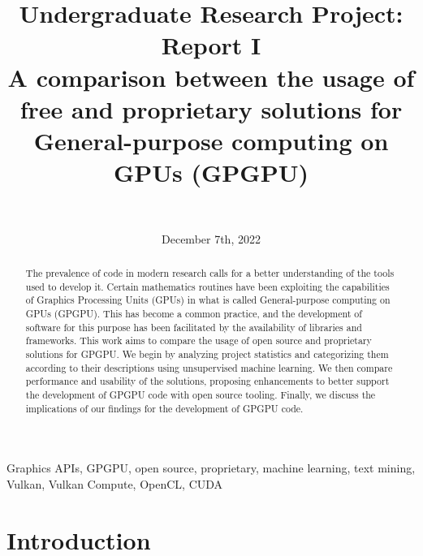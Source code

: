 \documentclass[11pt, conference, onecolumn, final]{IEEEtran}
\begin{document}
\title{\textbf{Undergraduate Research Project: Report I} \\
{A comparison between the usage of free and proprietary solutions for General-purpose computing on GPUs (GPGPU)}
}

\date{December 7th, 2022}

\author{ \\
\and
{}
}

\maketitle

\begin{abstract}
    The prevalence of code in modern research calls for a better understanding
    of the tools used to develop it.
    Certain mathematics routines have been exploiting the capabilities of
    Graphics Processing Units (GPUs) in what is called General-purpose
    computing on GPUs (GPGPU).
    This has become a common practice, and the development of software for this
    purpose has been facilitated by the availability of libraries and
    frameworks.
    This work aims to compare the usage of open source and proprietary
    solutions for GPGPU.
    We begin by analyzing project statistics and categorizing them according to
    their descriptions using unsupervised machine learning.
    We then compare performance and usability of the solutions, proposing
    enhancements to better support the development of GPGPU code with open
    source tooling.
    Finally, we discuss the implications of our findings for the development of
    GPGPU code.
\end{abstract}

\begin{IEEEkeywords}
    Graphics APIs, GPGPU, open source, proprietary, machine learning, text
    mining, Vulkan, Vulkan Compute, OpenCL, CUDA
\end{IEEEkeywords}

\listoftodos

\section{Introduction} \label{sec:intro}
\end{document}
